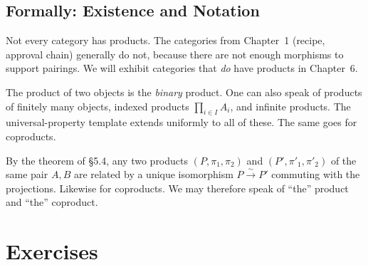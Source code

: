 \subsection{Formally: Existence and Notation}

Not every category has products. The categories from Chapter~1 (recipe,
approval chain) generally do not, because there are not enough morphisms to
support pairings. We will exhibit categories that \emph{do} have products
in Chapter~6.

The product of two objects is the \emph{binary} product. One can also speak
of products of finitely many objects, indexed products
$\prod_{i \in I} A_i$, and infinite products. The universal-property
template extends uniformly to all of these. The same goes for coproducts.

By the theorem of \S5.4, any two products $(P, \pi_1, \pi_2)$ and
$(P', \pi'_1, \pi'_2)$ of the same pair $A, B$ are related by a unique
isomorphism $P \xrightarrow{\sim} P'$ commuting with the projections.
Likewise for coproducts. We may therefore speak of ``the'' product and
``the'' coproduct.


\section*{Exercises}


